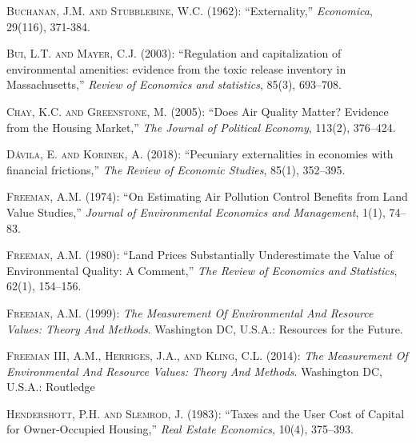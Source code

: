 \documentclass[ecta,nameyear,draft]{econsocart}
\theoremstyle{plain}
\theoremstyle{remark}
\begin{document}
\begin{thebibliography}{}
\textsc{Buchanan, J.M. and Stubblebine, W.C.} (1962):
``Externality,''
\textit{Economica}, 29(116), 371-384.
\endbibitem

\textsc{Bui, L.T. and Mayer, C.J.} (2003):
``Regulation and capitalization of environmental amenities: evidence from the toxic release inventory in Massachusetts,''
\textit{Review of Economics and statistics}, 85(3), 693--708.
\endbibitem


\textsc{Chay, K.C. and Greenstone, M.} (2005):
``Does Air Quality Matter? Evidence from the Housing Market,''
\textit{The Journal of Political Economy}, 113(2), 376--424.
\endbibitem
 
\textsc{Dávila, E. and Korinek, A.} (2018):
``Pecuniary externalities in economies with financial frictions,''
\textit{The Review of Economic Studies}, 85(1), 352--395.
\endbibitem

\textsc{Freeman, A.M.} (1974):
``On Estimating Air Pollution Control Benefits from Land Value Studies,''
\textit{Journal of Environmental Economics and Management}, 1(1), 74--83.
\endbibitem

\textsc{Freeman, A.M.} (1980):
``Land Prices Substantially Underestimate the Value of Environmental Quality: A Comment,''
\textit{The Review of Economics and Statistics}, 62(1), 154--156.
\endbibitem


\textsc{Freeman, A.M.} (1999):
\textit{The Measurement Of Environmental And Resource Values: Theory And Methods}.
Washington DC, U.S.A.: Resources for the Future.
\endbibitem
 
\textsc{Freeman III, A.M., Herriges, J.A., and Kling, C.L.} (2014):
\textit{The Measurement Of Environmental And Resource Values: Theory And Methods}.
Washington DC, U.S.A.: Routledge
\endbibitem 

\textsc{Hendershott, P.H. and Slemrod, J.} (1983):
``Taxes and the User Cost of Capital for Owner-Occupied Housing,''
\textit{Real Estate Economics}, 10(4), 375--393.
\endbibitem


\end{thebibliography}
\end{document}
